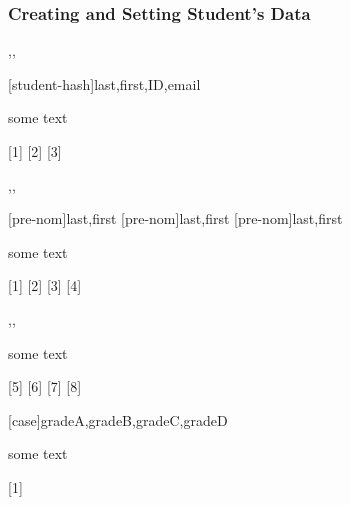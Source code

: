 \documentclass[10pt]{article}
\begin{document}
\subsubsection{Creating and Setting Student's Data}

\begin{codedescribe}{\student,\studentremark,\worktitle}
  \begin{codesyntax}
    \tsmacro{\student}[student-hash]{last,first,ID,email}
  \end{codesyntax}
  some text
\end{codedescribe}

[1]
[2]
[3]

\begin{codedescribe}{\advisor,\coadvisor,\examiner}
  \begin{codesyntax}
    \tsmacro{\advisor}[pre-nom]{last,first}
    \tsmacro{\coadvisor}[pre-nom]{last,first}
    \tsmacro{\examiner}[pre-nom]{last,first}
  \end{codesyntax}
  some text
\end{codedescribe}

[1]
[2]
[3]
[4]

\begin{codedescribe}{\advisorinfo,\coadvisorinfo,\examinerinfo}
  \begin{codesyntax}
  \end{codesyntax}
  some text
\end{codedescribe}

[5]
[6]
[7]
[8]


\begin{codedescribe}{\examinergrades}
\begin{codesyntax}
  \tsmacro{\examinergrades}[case]{gradeA,gradeB,gradeC,gradeD}
\end{codesyntax}  
some text
\end{codedescribe}

[1]
\end{document}
